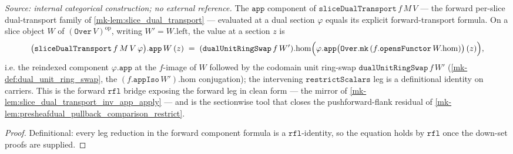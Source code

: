 \begin{lemma}\label{mk-lem:slice_dual_transport_app_apply}
  \leanok

  \textit{Source: internal categorical construction; no external reference.}
  The \(\mathtt{app}\) component of \(\mathtt{sliceDualTransport}\,f\,M\,V\) --- the forward per-slice
  dual-transport family of \ref{mk-lem:slice_dual_transport} --- evaluated at a dual section
  \(\varphi\) equals its explicit forward-transport formula. On a slice object \(W\) of
  \((\mathtt{Over}\,V)^{\mathrm{op}}\), writing \(W' = W.\mathrm{left}\), the value at a section
  \(z\) is
  \[
    \bigl(\mathtt{sliceDualTransport}\,f\,M\,V\,\varphi\bigr).\mathtt{app}\,W\,(z)
      \;=\;
    (\mathtt{dualUnitRingSwap}\,f\,W').\mathrm{hom}\Bigl(
      \varphi.\mathtt{app}\bigl(\mathtt{Over.mk}\,(f.\mathtt{opensFunctor}\,W.\mathrm{hom})\bigr)\,(z)\Bigr),
  \]
  i.e. the reindexed component \(\varphi.\mathtt{app}\) at the \(f\)-image of \(W\) followed by the
  codomain unit ring-swap \(\mathtt{dualUnitRingSwap}\,f\,W'\) (\ref{mk-def:dual_unit_ring_swap}, the
  \((f.\mathtt{appIso}\,W').\mathrm{hom}\) conjugation); the intervening \(\mathtt{restrictScalars}\)
  leg is a definitional identity on carriers. This is the forward \(\mathtt{rfl}\) bridge exposing
  the forward leg in clean form --- the mirror of \ref{mk-lem:slice_dual_transport_inv_app_apply} ---
  and is the sectionwise tool that closes the pushforward-flank residual of
  \ref{mk-lem:presheafdual_pullback_comparison_restrict}.
\end{lemma}
\begin{proof}
  \leanok
  Definitional: every leg reduction in the forward component formula is a \(\mathtt{rfl}\)-identity,
  so the equation holds by \(\mathtt{rfl}\) once the down-set proofs are supplied.
\end{proof}

